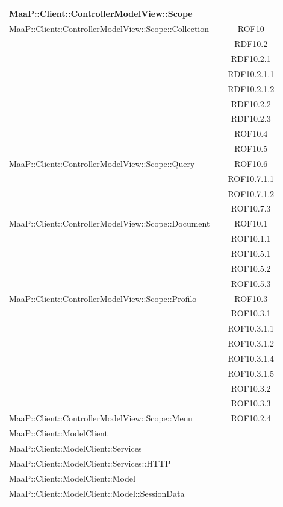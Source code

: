 \begin{center}
\begin{longtable}{|p{0.8\linewidth}|c|}
\midrule 
MaaP::Client::ControllerModelView::Scope
& \\

\midrule 
MaaP::Client::ControllerModelView::Scope::Collection
& ROF10\\
& RDF10.2\\
& RDF10.2.1\\
& RDF10.2.1.1\\
& RDF10.2.1.2\\
& RDF10.2.2\\
& RDF10.2.3\\
& ROF10.4\\
& ROF10.5\\

\midrule 
MaaP::Client::ControllerModelView::Scope::Query
& ROF10.6\\
& ROF10.7.1.1\\
& ROF10.7.1.2\\
& ROF10.7.3\\

\midrule 
MaaP::Client::ControllerModelView::Scope::Document
& ROF10.1\\
& ROF10.1.1\\
& ROF10.5.1\\
& ROF10.5.2\\
& ROF10.5.3\\


\midrule 
MaaP::Client::ControllerModelView::Scope::Profilo
& ROF10.3\\
& ROF10.3.1\\
& ROF10.3.1.1\\
& ROF10.3.1.2\\
& ROF10.3.1.4\\
& ROF10.3.1.5\\
& ROF10.3.2\\
& ROF10.3.3\\


\midrule 
MaaP::Client::ControllerModelView::Scope::Menu
& ROF10.2.4\\

\midrule 
MaaP::Client::ModelClient
& \\

\midrule 
MaaP::Client::ModelClient::Services
& \\

\midrule 
MaaP::Client::ModelClient::Services::HTTP
& \\

\midrule 
MaaP::Client::ModelClient::Model
& \\

\midrule 
MaaP::Client::ModelClient::Model::SessionData
& \\

\end{longtable}
\end{center}

